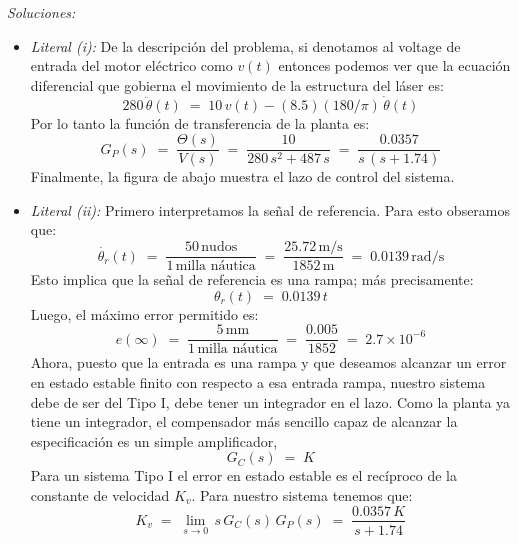 \documentclass[ a4paper, twoside, 11pt]{article}
\begin{document}
\begin{problem}
\emph{Soluciones:}
\begin{itemize}
\item \emph{Literal (i):} De la descripci\'on del problema, si denotamos al voltage de entrada del motor el\'ectrico como $v(t)$ entonces podemos ver que la ecuaci\'on diferencial que gobierna el movimiento de la estructura del l\'aser es: 
\[
280 \, \ddot{\theta}(t) \; = \; 10 \, v(t) - (8.5)(180/\pi) \, \dot{\theta}(t)
\]
Por lo tanto la funci\'on de transferencia de la planta es: 
\[
G_P(s) \; = \; \frac{\Theta(s)}{V(s)} \; = \;
\frac{10}{ 280 \, s^2 + 487 \,s } \; = \; \frac{0.0357}{ s \, ( s + 1.74 )}
\]
Finalmente, la figura de abajo muestra el lazo de control del sistema. 
\begin{figure}[htb]
\centering
\def\svgwidth{0.8\columnwidth}

\end{figure}

\item \emph{Literal (ii):} Primero interpretamos la se\~nal de referencia. Para esto obseramos que: 
\[
\dot{\theta_r}(t) \; = \; 
\frac{50 \, \text{nudos}}{1 \, \text{milla n\'autica}} \; = \; 
\frac{25.72 \, \text{m/s}}{1852 \, \text{m}} \; = \; 0.0139 \, \text{rad/s}
\]
Esto implica que la se\~nal de referencia es una rampa; m\'as precisamente: 
\[
\theta_r(t) \; = \; 0.0139 \, t
\]
Luego, el m\'aximo error permitido es: 
\[
e(\infty) \; = \; \frac{5 \, \text{mm}}{1 \, \text{milla n\'autica}} \; = \; \frac{0.005}{1852} \; = \; 2.7 \times 10^{-6}
\]
Ahora, puesto que la entrada es una rampa y que deseamos alcanzar un error en estado estable finito con respecto a esa entrada rampa, nuestro sistema debe de ser del Tipo I, \ie debe tener un integrador en el lazo. Como la planta ya tiene un integrador, el compensador m\'as sencillo capaz de alcanzar la especificaci\'on es un simple amplificador, \iec
\[
G_C(s) \; = \; K
\]
Para un sistema Tipo I el error en estado estable es el rec\'iproco de la constante de velocidad $K_v$. Para nuestro sistema tenemos que: 
\[
K_v \; = \; \lim_{ s \rightarrow 0 } \, s \, G_C(s) \, G_P(s)
\; = \; \frac{0.0357 \, K}{s + 1.74}
\]

\end{itemize}

\end{problem}
\vspace{\baselineskip}
\end{document}
